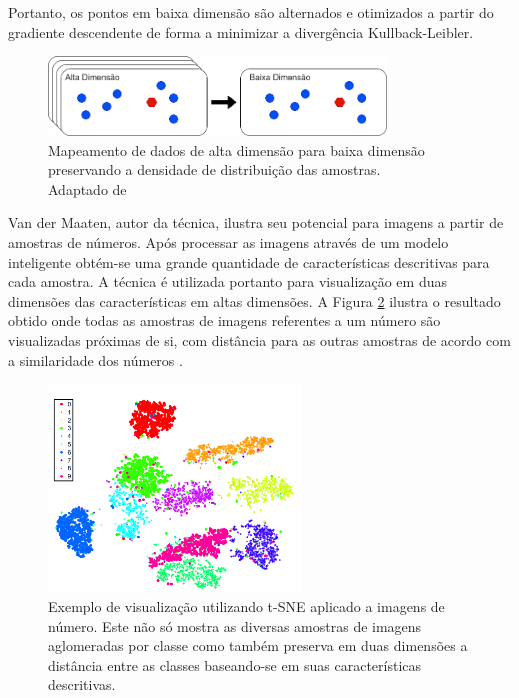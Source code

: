 \documentclass[12pt]{report}
\newcommand*{\captionsource}[2]{%
  \caption[{#1}]{%
    #1%
    \\\hspace{\linewidth}%
     \text{Fonte:}#2%
  }%
}
\begin{document}
Portanto, os pontos em baixa dimensão são alternados e otimizados a partir do gradiente descendente de forma a minimizar a divergência Kullback-Leibler.

\begin{figure}
    \centering
    \includegraphics[width=0.8\textwidth]{images/xdto2d.png}
    \captionsource{Mapeamento de dados de alta dimensão para baixa dimensão preservando a densidade de distribuição das amostras.}{ Adaptado de \protect\cite{techtalk}}
    \label{fig:xdto2d}
\end{figure}

Van der Maaten, autor da técnica, ilustra seu potencial para imagens a partir de amostras de números. Após processar as imagens através de um modelo inteligente obtém-se uma grande quantidade de características descritivas para cada amostra. A técnica é utilizada portanto para visualização em duas dimensões das características em altas dimensões. A Figura \ref{fig:tsne} ilustra o resultado obtido onde todas as amostras de imagens referentes a um número são visualizadas próximas de si, com distância para as outras amostras de acordo com a similaridade dos números \cite{techtalk}.

\begin{figure}
    \centering
    \includegraphics[width=0.6\textwidth]{images/ts.png}
    \captionsource{Exemplo de visualização utilizando t-SNE aplicado a imagens de número. Este não só mostra as diversas amostras de imagens aglomeradas por classe como também preserva em duas dimensões a distância entre as classes baseando-se em suas características descritivas.}{ \protect\cite{techtalk}}
    \label{fig:tsne}
\end{figure}
\end{document}
